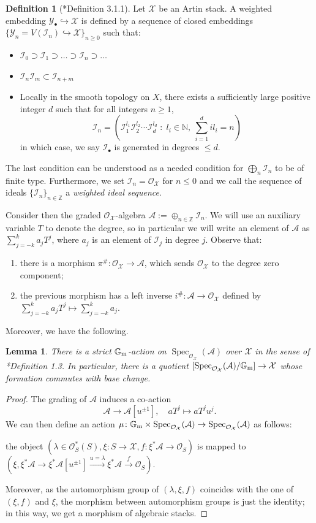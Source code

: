 \documentclass{amsart}
\newcommand{\bG}{\mathbb{G}}
\newcommand{\bN}{\mathbb{N}}
\newcommand{\bZ}{\mathbb{Z}}
\newcommand{\cA}{\mathcal{A}}
\newcommand{\cI}{\mathcal{I}}
\newcommand{\cO}{\mathcal{O}}
\newcommand{\cX}{\mathcal{X}}
\newcommand{\cY}{\mathcal{Y}}
\newcommand{\spec}{\operatorname{Spec}}
\newcommand{\Gm}{\bG_{{\rm m}}}
\newtheorem{Lemma}[theorem]{Lemma}
\theoremstyle{definition}
\newtheorem{Def}[theorem]{Definition}
\theoremstyle{definition}
\begin{document}
{\begin{Def}[\cite{QR}*{Definition 3.1.1}]\label{def_weighted_embedding}
   Let $\cX$ be an Artin stack. A weighted embedding $\cY_{\bullet} \hookrightarrow \cX$ is defined by a sequence of closed embeddings $\{ \cY_n=V(\cI_n) \hookrightarrow \cX \}_{n \ge 0}$ such that: \begin{itemize}
        \item $\cI_0 \supset \cI_1 \supset \dots \supset \cI_n \supset \dots$
        \item $\cI_n \cI_m \subset \cI_{n+m}$
        \item Locally in the smooth topology on $X$, there exists a sufficiently large positive integer $d$ such that for all integers $n \ge 1$, \[\cI_n=\left(\cI_1^{l_1}\cI_2^{l_2} \cdots \cI_d^{l_d} \; : \; l_i \in \bN, \ \sum_{i=1}^d il_i=n\right)\] in which case, we say $\cI_\bullet$ is generated in degrees $\le d$. 
    \end{itemize} 
    The last condition can be understood as a needed condition for $\bigoplus_n \cI_n$ to be of finite type.
    Furthermore, we set $\cI_n=\cO_{\cX}$ for $n\leq 0$ and we call the sequence of ideals $\{\cI_n\}_{n\in \bZ}$ a \textit{weighted ideal sequence}. 
\end{Def} 

Consider then the graded $\cO_\cX$-algebra $\cA:=\oplus_{n\in\bZ} \cI_n$. We will use an auxiliary variable $T$ to denote the degree, so in particular we will write an element of $\cA$ as $\sum_{j=-k}^ka_jT^j$, where $a_j$ is an element of $\cI_j$ in degree $j$. Observe that:
\begin{enumerate}
    \item there is a morphism $\pi^\#:\cO_\cX\to \cA$, which sends $\cO_\cX$ to the degree zero component;
    \item the previous morphism has a left inverse $i^\#:\cA \to \cO_\cX$ defined by $\sum_{j=-k}^ka_jT^j\mapsto \sum_{j=-k}^ka_j$.
\end{enumerate}
Moreover, we have the following.
\begin{Lemma}\label{lm:action}
    There is a strict $\Gm$-action on $\spec_{\cO_\cX}(\cA)$ over $\cX$ in the sense of \cite{Rom05}*{Definition 1.3}. In particular, there is a quotient $[\spec_{\cO_\cX}(\cA)/\Gm] \to \cX$ whose formation commutes with base change.
\end{Lemma}
\begin{proof}
    The grading of $\cA$ induces a co-action
    \[ \cA \longrightarrow \cA[u^{\pm 1}],\quad aT^j\longmapsto aT^ju^j.\]
    We can then define an action $\mu\colon\Gm \times \spec_{\cO_\cX}(\cA) \to \spec_{\cO_\cX}(\cA)$ as follows: \begin{center} the object $(\lambda \in \cO_S^*(S), \xi\colon S\to\cX, f\colon \xi^*\cA \to \cO_S)$ is mapped to $(\xi, \xi^*\cA \to \xi^*\cA[u^{\pm 1}] \overset{{u=\lambda}}{\longrightarrow} \xi^*\cA \overset{f}{\to} \cO_S).$\end{center}
    Moreover, as the automorphism group of $(\lambda,\xi,f)$ coincides with the one of $(\xi,f)$ and $\xi$, the morphism between automorphism groups is just the identity; in this way, we get a morphism of algebraic stacks.


\end{proof}}
\end{document}
